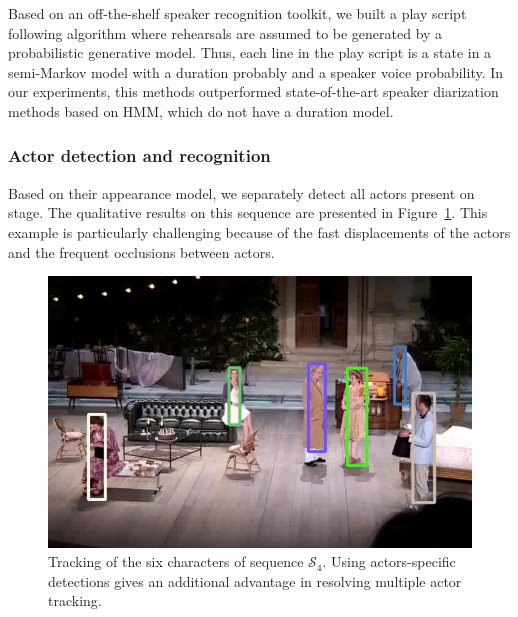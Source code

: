 \documentclass[conference]{IEEEtran}
\begin{document}
Based on an off-the-shelf speaker recognition toolkit, we built a play script following algorithm where rehearsals are assumed to be generated by a probabilistic generative model.  Thus, each  line in the play script is a state in a semi-Markov model with a duration probably and a speaker voice probability. In our experiments, this methods outperformed state-of-the-art speaker diarization methods based on HMM, which do not have a duration model.



\subsubsection{Actor detection and recognition} 

Based on their appearance model, we separately detect all actors present on stage. The qualitative results on this sequence are presented in Figure~\ref{fig_tracking_coahtr}. This example is particularly challenging  because of the fast displacements of the actors and the frequent occlusions between actors. 

\begin{figure}[tp]
\centering
\includegraphics[width=\columnwidth]{tracking_coahtr}
\caption{Tracking of  the six characters of sequence $\mathcal{S}_4$. Using actors-specific detections gives an additional advantage in resolving multiple actor tracking.}
\label{fig_tracking_coahtr}
\end{figure}
\end{document}
